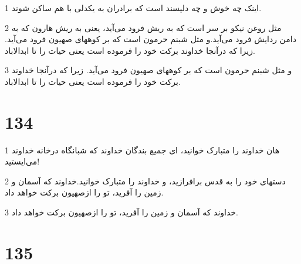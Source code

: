 \par 1 اینک چه خوش و چه دلپسند است که برادران به یکدلی با هم ساکن شوند.
\par 2 مثل روغن نیکو بر سر است که به ریش فرود می‌آید، یعنی به ریش هارون که به دامن ردایش فرود می‌آید.و مثل شبنم حرمون است که بر کوههای صهیون فرود می‌آید. زیرا که درآنجا خداوند برکت خود را فرموده است یعنی حیات را تا ابدالاباد.
\par 3 و مثل شبنم حرمون است که بر کوههای صهیون فرود می‌آید. زیرا که درآنجا خداوند برکت خود را فرموده است یعنی حیات را تا ابدالاباد.
 
\chapter{134}

\par 1 هان خداوند را متبارک خوانید، ای جمیع بندگان خداوند که شبانگاه درخانه خداوند می‌ایستید!
\par 2 دستهای خود را به قدس برافرازید، و خداوند را متبارک خوانید.خداوند که آسمان و زمین را آفرید، تو را ازصهیون برکت خواهد داد.
\par 3 خداوند که آسمان و زمین را آفرید، تو را ازصهیون برکت خواهد داد.
 
\chapter{135}

